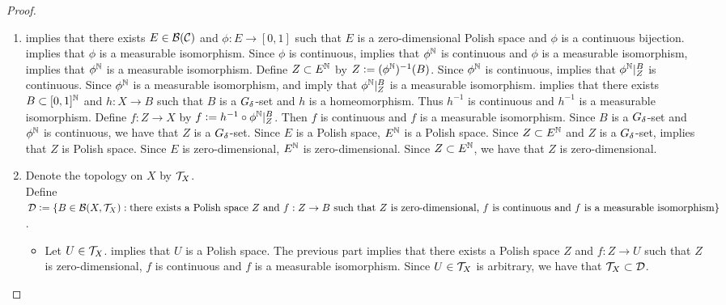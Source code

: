 \documentclass{book}
\begin{document}
	\begin{proof}\
		\begin{enumerate}
			\item {} implies that there exists $E \in \mathcal{B}(\mathcal{C})$ and $\phi: E \rightarrow [0,1]$ such that $E$ is a zero-dimensional Polish space and $\phi$ is a continuous bijection.  implies that $\phi$ is a measurable isomorphism. Since $\phi$ is continuous,  implies that $\phi^{\mathbb{N}}$ is continuous and $\phi$ is a measurable isomorphism,  implies that $\phi^{\mathbb{N}}$ is a measurable isomorphism. Define $Z \subset E^{\mathbb{N}}$ by $Z \vcentcolon= (\phi^{\mathbb{N}})^{-1}(B)$. Since $\phi^{\mathbb{N}}$ is continuous,  implies that $\phi^{\mathbb{N}}|^B_Z$ is continuous. Since $\phi^{\mathbb{N}}$ is a measurable isomorphism,  and  imply that $\phi^{\mathbb{N}}|^B_Z$ is a measurable isomorphism.  implies that there exists $B \subset [0,1]^{\mathbb{N}}$ and $h: X \rightarrow B$ such that $B$ is a $G_{\delta}$-set and $h$ is a homeomorphism. Thus $h^{-1}$ is continuous and $h^{-1}$ is a measurable isomorphism. Define $f:Z \rightarrow X$ by $f \vcentcolon= h^{-1} \circ \phi^{\mathbb{N}}|^B_Z$. Then $f$ is continuous and $f$ is a measurable isomorphism. Since $B$ is a $G_{\delta}$-set and $\phi^{\mathbb{N}}$ is continuous, we have that $Z$ is a $G_{\delta}$-set. Since $E$ is a Polish space, $E^{\mathbb{N}}$ is a Polish space. Since $Z \subset E^{\mathbb{N}}$ and $Z$ is a $G_{\delta}$-set,  implies that $Z$ is Polish space. Since $E$ is zero-dimensional, $E^{\mathbb{N}}$ is zero-dimensional. Since $Z \subset E^{\mathbb{N}}$, we have that $Z$ is zero-dimensional. 
			\item Denote the topology on $X$ by $\mathcal{T}_X$. \\
			Define $\mathcal{D} \vcentcolon= \{B \in \mathcal{B}(X, \mathcal{T}_X): \text{there exists a Polish space $Z$ and $f:Z \rightarrow B$ such that $Z$ is zero-dimensional, } \\ \text{$f$ is continuous and $f$ is a measurable isomorphism}\}$.
			\begin{itemize}
				\item Let $U \in \mathcal{T}_X$.  implies that $U$ is a Polish space. The previous part implies that there exists a Polish space $Z$ and $f:Z \rightarrow U$ such that $Z$ is zero-dimensional, $f$ is continuous and $f$ is a measurable isomorphism. Since $U \in \mathcal{T}_X$ is arbitrary, we have that $\mathcal{T}_X \subset \mathcal{D}$.

\end{itemize}
\end{enumerate}
\end{proof}
\end{document}
